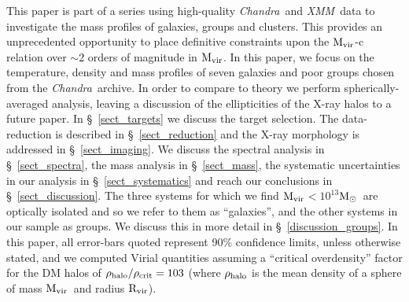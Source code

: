 \documentclass{emulateapj}
\def \msun {${\rm M_\odot}$}
\newcommand{\mvir}{${\rm M_{vir}}$}
\newcommand{\chandra }{{\em Chandra}}
\newcommand{\xmm }{{\em XMM}}
\newcommand{\rvir }{${\rm R_{vir}}$}
\begin{document}
This paper is part of a series 
\citep[see also][]{gastaldello06a,zappacosta06a,buote06b,buote06a}
using high-quality \chandra\ and \xmm\ data to investigate the 
mass profiles of  galaxies, groups and clusters. This provides
an unprecedented opportunity to place definitive constraints upon 
the \mvir-c relation over $\sim$2 orders
of magnitude in \mvir. In this paper, we focus on the temperature,
density and mass profiles of seven galaxies and poor groups 
chosen from the \chandra\ archive.
In order to compare to theory we perform spherically-averaged
analysis, leaving a discussion of the ellipticities of the 
X-ray halos to a future paper.
In \S~\ref{sect_targets} we discuss the target selection. The 
data-reduction is described in \S~\ref{sect_reduction} and 
the X-ray morphology is addressed in \S~\ref{sect_imaging}.
We discuss the spectral analysis in \S~\ref{sect_spectra}, the
mass analysis in \S~\ref{sect_mass}, the systematic uncertainties
in our analysis in \S~\ref{sect_systematics}
and reach our conclusions in \S~\ref{sect_discussion}.
The three systems for which we find \mvir$<10^{13}$\msun\ are
optically isolated and so we refer to them as ``galaxies'', and
the other systems in our sample as groups. We discuss this in
more detail in  \S~\ref{discussion_groups}.
In this paper, all error-bars quoted represent 90\% confidence limits, 
unless otherwise stated, and we computed Virial quantities assuming 
a ``critical overdensity''
factor for the DM halos of $\rho_{\rm halo}/\rho_{\rm crit} = 103$
(where $\rho_{\rm halo}$ is the mean density of a sphere of 
mass \mvir\ and radius \rvir).
\end{document}
